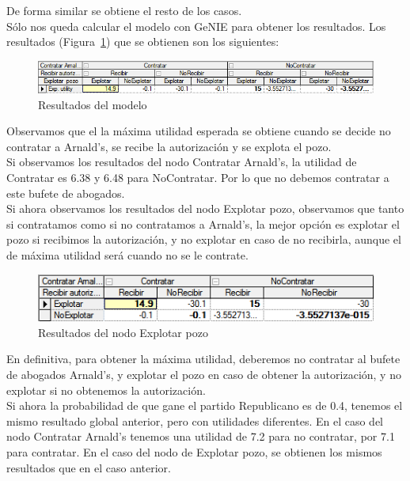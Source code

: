 \documentclass[12pt,a4paper,openright,final]{article}
\begin{document}
De forma similar se obtiene el resto de los casos.\\

Sólo nos queda calcular el modelo con GeNIE para obtener los resultados. Los resultados (Figura~\ref{fig:resultado}) que se obtienen son los siguientes:\\

\begin{figure}[tbph!]
	\centering
	\includegraphics[width=\linewidth]{imagenes/resultado.png}
	\caption{Resultados del modelo}
	\label{fig:resultado}
\end{figure}

Observamos que el la máxima utilidad esperada se obtiene cuando se decide no contratar a Arnald's, se recibe la autorización y se explota el pozo.\\

Si observamos los resultados del nodo Contratar Arnald's, la utilidad de Contratar es 6.38 y 6.48 para NoContratar. Por lo que no debemos contratar a este bufete de abogados.\\

Si ahora observamos los resultados del nodo Explotar pozo, observamos que tanto si contratamos como si no contratamos a Arnald's, la mejor opción es explotar el pozo si recibimos la autorización, y no explotar en caso de no recibirla, aunque el de máxima utilidad será cuando no se le contrate.\\

\begin{figure}[tbph!]
	\centering
	\includegraphics[width=\linewidth]{imagenes/resultados_pozo.png}
	\caption{Resultados del nodo Explotar pozo}
	\label{fig:resultados_pozo}
\end{figure}

En definitiva, para obtener la máxima utilidad, deberemos no contratar al bufete de abogados Arnald's, y explotar el pozo en caso de obtener la autorización, y no explotar si no obtenemos la autorización.\\

Si ahora la probabilidad de que gane el partido Republicano es de 0.4, tenemos el mismo resultado global anterior, pero con utilidades diferentes. En el caso del nodo Contratar Arnald's tenemos una utilidad de 7.2 para no contratar, por 7.1 para contratar. En el caso del nodo de Explotar pozo, se obtienen los mismos resultados que en el caso anterior.\\
\end{document}

